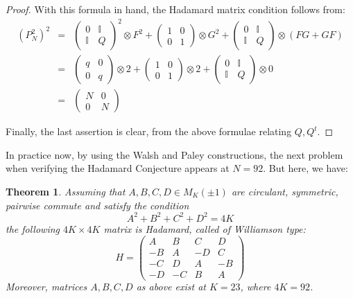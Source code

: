 \documentclass[12pt]{amsbook}
\newtheorem{theorem}{Theorem}[chapter]
\begin{document}
\begin{proof}
With this formula in hand, the Hadamard matrix condition follows from:
\begin{eqnarray*}
(P_N^2)^2
&=&\begin{pmatrix}0&\mathbb I\\ \mathbb I&Q\end{pmatrix}^2\otimes F^2+\begin{pmatrix}1&0\\ 0&1\end{pmatrix}\otimes G^2+\begin{pmatrix}0&\mathbb I\\ \mathbb I&Q\end{pmatrix}\otimes(FG+GF)\\
&=&\begin{pmatrix}q&0\\ 0&q\end{pmatrix}\otimes 2+\begin{pmatrix}1&0\\ 0&1\end{pmatrix}\otimes 2+\begin{pmatrix}0&\mathbb I\\ \mathbb I&Q\end{pmatrix}\otimes0\\
&=&\begin{pmatrix}N&0\\ 0&N\end{pmatrix}
\end{eqnarray*}

Finally, the last assertion is clear, from the above formulae relating $Q,Q^t$.
\end{proof}

In practice now, by using the Walsh and Paley constructions, the next problem when verifying the Hadamard Conjecture appears at $N=92$. But here, we have:

\begin{theorem}
Assuming that $A,B,C,D\in M_K(\pm1)$ are circulant, symmetric, pairwise commute and satisfy the condition
$$A^2+B^2+C^2+D^2=4K$$
the following $4K\times4K$ matrix is Hadamard, called of Williamson type:
$$H=\begin{pmatrix}
A&B&C&D\\
-B&A&-D&C\\
-C&D&A&-B\\
-D&-C&B&A
\end{pmatrix}$$
Moreover, matrices $A,B,C,D$ as above exist at $K=23$, where $4K=92$.
\end{theorem}
\end{document}
